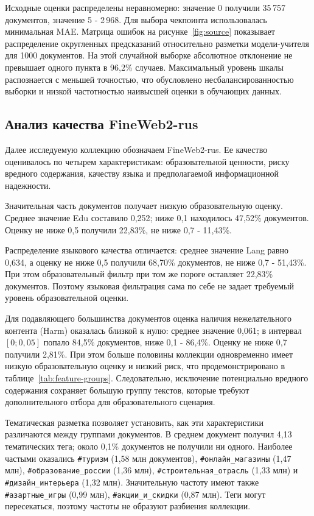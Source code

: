 \documentclass[12pt,a4paper]{article}
\begin{document}
Исходные оценки распределены неравномерно: значение 0 получили 35\,757 документов,
значение 5 - 2\,968. Для выбора чекпоинта использовалась минимальная MAE.
Матрица ошибок на рисунке~\ref{fig:source} показывает распределение округленных предсказаний
относительно разметки модели-учителя для 1000 документов.
На этой случайной выборке абсолютное отклонение не превышает одного пункта
в 96,2\% случаев. Максимальный уровень шкалы распознается с меньшей точностью, 
что обусловлено несбалансированностью выборки и низкой частотностью наивысшей оценки в обучающих данных.

\subsection{Анализ качества FineWeb2-rus}
Далее исследуемую коллекцию обозначаем FineWeb2-rus. 
Ее качество оценивалось по четырем характеристикам: образовательной ценности, 
риску вредного содержания, качеству языка и предполагаемой информационной надежности.

Значительная часть документов получает низкую образовательную оценку.
Среднее значение Edu составило 0,252; ниже 0,1 находилось 47,52\% документов.
Оценку не ниже 0,5 получили 22,83\%, не ниже 0,7 - 11,43\%.

Распределение языкового качества отличается: среднее значение Lang равно 0,634,
а оценку не ниже 0,5 получили 68,70\% документов, не ниже 0,7 - 51,43\%.
При этом образовательный фильтр при том же пороге оставляет 22,83\% документов.
Поэтому языковая фильтрация сама по себе не задает требуемый уровень образовательной оценки.

Для подавляющего большинства документов оценка наличия нежелательного контента (Harm) оказалась близкой к нулю: 
среднее значение 0,061; в интервал $[0;0{,}05]$ попало 84,5\% документов,
ниже 0,1 - 86,4\%. Оценку не ниже 0,7 получили 2,81\%.
При этом больше половины коллекции одновременно имеет низкую образовательную оценку
и низкий риск, что продемонстрировано в таблице~\ref{tab:feature-groups}.
Следовательно, исключение потенциально вредного содержания сохраняет большую группу текстов,
которые требуют дополнительного отбора для образовательного сценария.

Тематическая разметка позволяет установить, как эти характеристики различаются
между группами документов. В среднем документ получил 4,13 тематических тега;
около 0,1\% документов не получили ни одного.
Наиболее частыми оказались \texttt{\#туризм} (1,58 млн документов),
\texttt{\#онлайн\_магазины} (1,47 млн), \texttt{\#образование\_россии} (1,36 млн),
\texttt{\#строительная\_отрасль} (1,33 млн) и \texttt{\#дизайн\_интерьера} (1,32 млн).
Значительную частоту имеют также \texttt{\#азартные\_игры} (0,99 млн),
\texttt{\#акции\_и\_скидки} (0,87 млн).
Теги могут пересекаться, поэтому частоты не образуют разбиения коллекции.
\end{document}
